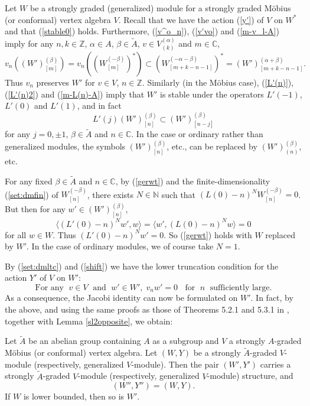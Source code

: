 \documentclass[12pt]{article}
\begin{document}
Let $W$ be a strongly graded (generalized) module for a strongly
graded M\"obius (or conformal) vertex algebra $V$. Recall that we have
the action (\ref{y'}) of $V$ on $W^*$ and that (\ref{stable0}) holds.
Furthermore, (\ref{v^o_n}), (\ref{v'vo}) and (\ref{m-v_l-A}) imply
for any $n,k\in {\mathbb Z}$, $\alpha\in A$, $\beta\in \tilde A$, $v\in
V^{(\alpha)}_{(k)}$ and $m\in {\mathbb C}$,
\begin{equation}\label{shift}
v_n((W')^{(\beta)}_{[m]})=v_n((W^{(-\beta)}_{[m]})^*)\subset
(W^{(-\alpha-\beta)}_{[m+k-n-1]})^* =(W')^{(\alpha+\beta)}_{[m+k-n-1]}.
\end{equation}
Thus $v_n$ preserves $W'$ for $v \in V$, $n \in {\mathbb Z}$.  Similarly
(in the M\"obius case), (\ref{L'(n)}), (\ref{L'(n)2}) and
(\ref{m-L(n)-A}) imply that $W'$ is stable under the operators
$L'(-1)$, $L'(0)$ and $L'(1)$, and in fact
\[
L'(j)(W')^{(\beta)}_{[n]}\subset (W')^{(\beta)}_{[n-j]}
\]
for any $j=0,\pm 1$, $\beta\in \tilde A$ and $n\in {\mathbb C}$.  In
the case or ordinary rather than generalized modules, the symbols
$(W')^{(\beta)}_{[n]}$, etc., can be replaced by
$(W')^{(\beta)}_{(n)}$, etc.

For any fixed $\beta\in \tilde A$ and $n\in {\mathbb C}$, by
(\ref{gerwt}) and the finite-dimensionality (\ref{set:dmfin}) of
$W^{(-\beta)}_{[n]}$, there exists $N\in {\mathbb N}$
such that $(L(0)-n)^NW^{(-\beta)}_{[n]}=0$. But then for any $w'\in
(W')^{(\beta)}_{[n]}$,
\begin{equation}\label{L(0)N}
\langle (L'(0)-n)^Nw',w\rangle=\langle w',(L(0)-n)^Nw\rangle=0
\end{equation}
for all $w\in W$. Thus $(L'(0)-n)^Nw'=0$. So (\ref{gerwt}) holds with
$W$ replaced by $W'$.  In the case of ordinary modules, we of course
take $N=1$.

By (\ref{set:dmltc}) and (\ref{shift}) we have the lower truncation
condition for the action $Y'$ of $V$ on $W'$:
\begin{equation}\label{truncationforY'}
\mbox{For any }\;v\in V\;\mbox{ and }\;w'\in W',\; v_nw'=0\;\;
\mbox{ for }\;n\;\mbox{ sufficiently large}.
\end{equation}
As a consequence, the Jacobi identity can now be formulated on
$W'$. In fact, by the above, and using the same proofs as those of
Theorems 5.2.1 and 5.3.1 in \cite{FHL}, together with Lemma
\ref{sl2opposite}, we obtain:

\begin{theo}\label{set:W'}
Let $\tilde A$ be an abelian group containing $A$ as a subgroup and
$V$ a strongly $A$-graded M\"obius (or conformal) vertex algebra. Let
$(W,Y)$ be a strongly $\tilde A$-graded $V$-module (respectively,
generalized $V$-module). Then the pair $(W',Y')$ carries a strongly
$\tilde A$-graded $V$-module (respectively, generalized $V$-module)
structure, and
\[
(W'',Y'')=(W,Y).
\]
If $W$ is lower bounded, then so is $W'$.  \epf
\end{theo}
\end{document}
